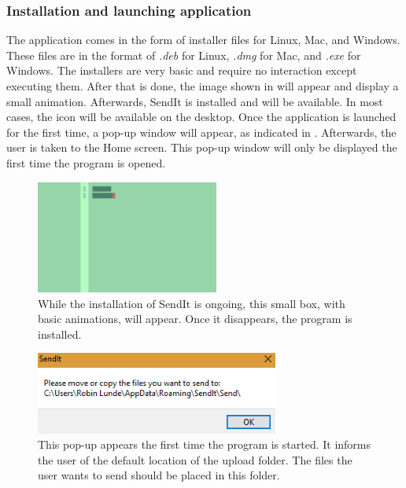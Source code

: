     \subsubsection*{Installation and launching application}
    The application comes in the form of installer files for Linux, Mac, and Windows. These files are in the format of \emph{.deb} for Linux, \emph{.dmg} for Mac, and \emph{.exe} for Windows. The installers are very basic and require no interaction except executing them. After that is done, the image shown in  will appear and display a small animation. Afterwards, SendIt is installed and will be available. In most cases, the icon will be available on the desktop. Once the application is launched for the first time, a pop-up window will appear, as indicated in . Afterwards, the user is taken to the Home screen. This pop-up window will only be displayed the first time the program is opened.
    \begin{figure}[H]
      \centering
      \includegraphics[width=60mm]{Figures/Base/installer}
      \decoRule
      \caption[SendIt: Install animation]{While the installation of SendIt is ongoing, this small box, with basic animations, will appear. Once it disappears, the program is installed.}
      \label{fig:inst}
    \end{figure}

    \begin{figure}[H]
      \centering
      \includegraphics[width=80mm]{Figures/Base/start_up}
      \decoRule
      \caption[SendIt: First launch pop-up]{This pop-up appears the first time the program is started. It informs the user of the default location of the upload folder. The files the user wants to send should be placed in this folder.}
      \label{fig:popup}
    \end{figure}  
